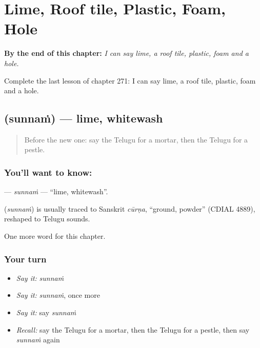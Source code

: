 
\chapter{Lime, Roof tile, Plastic, Foam, Hole}
\label{ch:te-lime-roof-tile-plastic-foam-hole}

\begin{chapteropening}
\textbf{By the end of this chapter:} \emph{I can say lime, a roof tile, plastic, foam and a hole.}

Complete the last lesson of chapter 271: I can say lime, a roof tile, plastic, foam and a hole.
\end{chapteropening}

\section[\texorpdfstring{\te{సున్నం} (sunnaṁ)}{సున్నం (sunnaṁ)}]{ (sunnaṁ) — lime, whitewash}

\label{lesson:TE-C271-sunnam}



\begin{quote}
Before the new one: say the Telugu for a mortar, then the Telugu for a pestle.
\end{quote}

\subsection*{You'll want to know: }
\textbf{} — \emph{sunnaṁ} — \textquotedblleft{}lime, whitewash\textquotedblright{}.

\begin{cousinweb}
\textbf{} (\emph{sunnaṁ}) is usually traced to Sanskrit \emph{cūrṇa}, \textquotedblleft{}ground, powder\textquotedblright{} (CDIAL 4889), reshaped to Telugu sounds.
\end{cousinweb}

\begin{grammarlens}[title={What you've built}]
One more word for this chapter.
\end{grammarlens}

\subsection*{Your turn}
\begin{itemize}
\raggedright
  \item \emph{Say it:} \emph{sunnaṁ}
  \item \emph{Say it:} \emph{sunnaṁ}, once more
  \item \emph{Say it:} say \emph{sunnaṁ}
  \item \emph{Recall:} say the Telugu for a mortar, then the Telugu for a pestle, then say \emph{sunnaṁ} again
\end{itemize}

